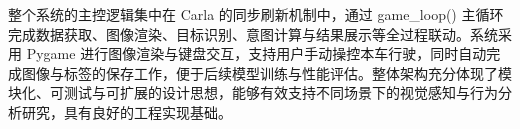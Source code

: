 整个系统的主控逻辑集中在 Carla 的同步刷新机制中，通过 game\_loop() 主循环完成数据获取、图像渲染、目标识别、意图计算与结果展示等全过程联动。系统采用 Pygame 进行图像渲染与键盘交互，支持用户手动操控本车行驶，同时自动完成图像与标签的保存工作，便于后续模型训练与性能评估。整体架构充分体现了模块化、可测试与可扩展的设计思想，能够有效支持不同场景下的视觉感知与行为分析研究，具有良好的工程实现基础。




\begin{tabular}{l l}
\end{tabular}
